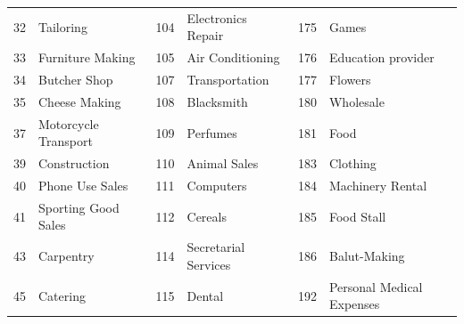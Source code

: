 \begin{longtable}[]{|r|l|r|l|r|l|}
    32                                & Tailoring                          & 104                               & Electronics Repair                 & 175                               & Games                              \\
    33                                & Furniture Making                   & 105                               & Air Conditioning                   & 176                               & Education
    provider                                                                                                                                                                                                                 \\
    34                                & Butcher Shop                       & 107                               & Transportation                     & 177                               & Flowers                            \\
    35                                & Cheese Making                      & 108                               & Blacksmith                         & 180                               & Wholesale                          \\
    37                                & Motorcycle Transport               & 109                               & Perfumes                           & 181                               & Food                               \\
    39                                & Construction                       & 110                               & Animal Sales                       & 183                               & Clothing                           \\
    40                                & Phone Use Sales                    & 111                               & Computers                          & 184                               & Machinery Rental                   \\
    41                                & Sporting Good Sales                & 112                               & Cereals                            & 185                               & Food Stall                         \\
    43                                & Carpentry                          & 114                               & Secretarial Services               & 186                               & Balut-Making                       \\
    45                                & Catering                           & 115                               & Dental                             & 192                               & Personal Medical Expenses          \\

\end{longtable}
